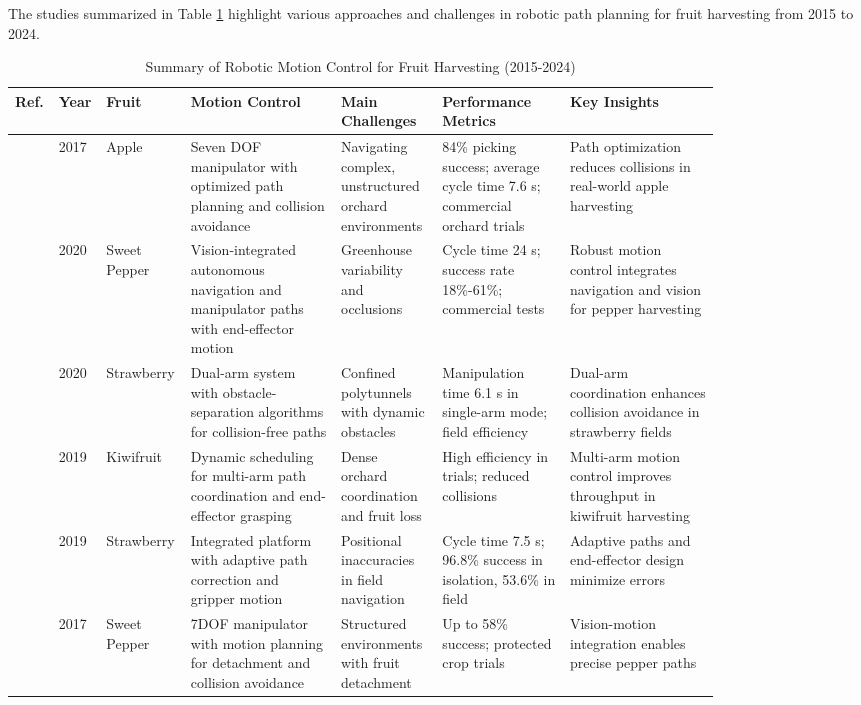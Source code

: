 \documentclass{ieeeaccess}
\begin{document}
The studies summarized in Table \ref{tab:motion-control-based} highlight various approaches and challenges in robotic path planning for fruit harvesting from 2015 to 2024.
\iffalse
\begin{table}[htbp]
\centering
\small
\caption{Summary of Robotic Motion Control for Fruit Harvesting (2015-2024)}
\label{tab:motion-control-based}
\begin{tabular}{p{0.025\linewidth} p{0.025\linewidth} p{0.055\linewidth} p{0.2\linewidth} p{0.135\linewidth} p{0.175\linewidth} p{0.2\linewidth}}
\toprule
\textbf{Ref.} & \textbf{Year} & \textbf{Fruit} & \textbf{Motion Control} & \textbf{Main Challenges} & \textbf{Performance Metrics} & \textbf{Key Insights} \\ \midrule
\cite{silwal2017design} & 2017 & Apple & Seven DOF manipulator with optimized path planning and collision avoidance & Navigating complex, unstructured orchard environments & 84\% picking success; average cycle time 7.6 s; commercial orchard trials & Path optimization reduces collisions in real-world apple harvesting \\ \midrule
\cite{arad2020development} & 2020 & Sweet Pepper & Vision-integrated autonomous navigation and manipulator paths with end-effector motion & Greenhouse variability and occlusions & Cycle time 24 s; success rate 18\%-61\%; commercial tests & Robust motion control integrates navigation and vision for pepper harvesting \\ \midrule
\cite{xiong2020autonomous} & 2020 & Strawberry & Dual-arm system with obstacle-separation algorithms for collision-free paths & Confined polytunnels with dynamic obstacles & Manipulation time 6.1 s in single-arm mode; field efficiency & Dual-arm coordination enhances collision avoidance in strawberry fields \\ \midrule
\cite{williams2019robotic} & 2019 & Kiwifruit & Dynamic scheduling for multi-arm path coordination and end-effector grasping & Dense orchard coordination and fruit loss & High efficiency in trials; reduced collisions & Multi-arm motion control improves throughput in kiwifruit harvesting \\ \midrule
\cite{xiong2019development} & 2019 & Strawberry & Integrated platform with adaptive path correction and gripper motion & Positional inaccuracies in field navigation & Cycle time 7.5 s; 96.8\% success in isolation, 53.6\% in field & Adaptive paths and end-effector design minimize errors \\ \midrule
\cite{lehnert2017autonomous} & 2017 & Sweet Pepper & 7DOF manipulator with motion planning for detachment and collision avoidance & Structured environments with fruit detachment & Up to 58\% success; protected crop trials & Vision-motion integration enables precise pepper paths \\ \midrule

\end{tabular}
\end{table}
\end{document}
